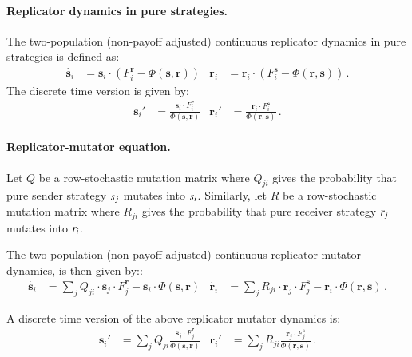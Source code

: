 \documentclass[fleqn,reqno,10pt]{article}
\renewcommand{\Smixed}{\ensuremath{\mathrm{\mathbf{s}}}}
\renewcommand{\Rmixed}{\ensuremath{\mathrm{\mathbf{r}}}}
\begin{document}
\paragraph{Replicator dynamics in pure strategies.} The two-population
(non-payoff adjusted) continuous replicator dynamics in pure
strategies is defined as:
\begin{align*}
  \dot{\Smixed_i} & = \Smixed_i \cdot \left ( F_i^{\Rmixed} -
  \Phi(\Smixed,\Rmixed) \right ) &   \dot{\Rmixed_i} &  = \Rmixed_i \cdot \left ( F_i^{\Smixed} -
  \Phi(\Rmixed,\Smixed) \right ) \,.
\end{align*}
The discrete time version is given by: 
\begin{align*}
  \Smixed_i' & = \frac{\Smixed_i \cdot
  F_i^{\Rmixed}}{ \Phi(\Smixed,\Rmixed)} &     \Rmixed_i' & = \frac{\Rmixed_i \cdot
  F_i^{\Smixed}}{ \Phi(\Rmixed,\Smixed)} \,.
\end{align*}


\paragraph{Replicator-mutator equation.} Let $Q$ be a row-stochastic
mutation matrix where $Q_{ji}$ gives the probability that pure sender
strategy $s_j$ mutates into $s_i$. Similarly, let $R$ be a
row-stochastic mutation matrix where $R_{ji}$ gives the probability
that pure receiver strategy $r_j$ mutates into $r_i$.

The two-population (non-payoff adjusted) continuous replicator-mutator
dynamics, is then given by::
\begin{align*}
  \dot{\Smixed_i} & = \sum_{j}  Q_{ji} \cdot \Smixed_j
    \cdot F_j^{\Rmixed} - \Smixed_i \cdot \Phi(\Smixed,\Rmixed) &
    \dot{\Rmixed_i} & = \sum_{j}  R_{ji} \cdot \Rmixed_j
    \cdot F_j^{\Smixed} - \Rmixed_i \cdot \Phi(\Rmixed,\Smixed) \,.
\end{align*}
\begin{claim} A discrete time version of the above replicator mutator
  dynamics is:
  \begin{align*}
    \Smixed_i' & = \sum_{j} Q_{ji} \frac{\Smixed_j \cdot
      F_j^{\Rmixed}}{ \Phi(\Smixed,\Rmixed)} & \Rmixed_i' & = \sum_{j}
    R_{ji} \frac{\Rmixed_j \cdot F_j^{\Smixed}}{
      \Phi(\Rmixed,\Smixed)}\,.
  \end{align*}
\end{claim}
\end{document}
